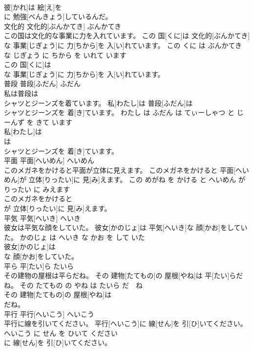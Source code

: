 \documentclass[8pt]{extreport}
\begin{document}
\begin{CJK}{UTF8}{min}
\\	彼[かれ]は 絵[え]を
\\	に 勉強[べんきょう]しているんだ。			
\\	文化的	文化的[ぶんかてき]	ぶんかてき	
\\	この国は文化的な事業に力を入れています。	この 国[くに]は 文化的[ぶんかてき]な 事業[じぎょう]に 力[ちから]を 入[い]れています。	この くに は ぶんかてき な じぎょう に ちから を いれて います	
\\	この 国[くに]は
\\	な 事業[じぎょう]に 力[ちから]を 入[い]れています。			
\\	普段	普段[ふだん]	ふだん	
\\	私は普段は
\\	シャツとジーンズを着ています。	私[わたし]は 普段[ふだん]は 
\\	[てぃー]シャツとジーンズを 着[き]ています。	わたし は ふだん は てぃーしゃつ と じーんず を きて います	
\\	私[わたし]は
\\	は 
\\	[てぃー]シャツとジーンズを 着[き]ています。			
\\	平面	平面[へいめん]	へいめん	
\\	このメガネをかけると平面が立体に見えます。	このメガネをかけると 平面[へいめん]が 立体[りったい]に 見[み]えます。	この めがね を かける と へいめん が りったい に みえます	
\\	このメガネをかけると
\\	が 立体[りったい]に 見[み]えます。			
\\	平気	平気[へいき]	へいき	
\\	彼女は平気な顔をしていた。	彼女[かのじょ]は 平気[へいき]な 顔[かお]をしていた。	かのじょ は へいき な かお を して いた	
\\	彼女[かのじょ]は
\\	な 顔[かお]をしていた。			
\\	平ら	平[たい]ら	たいら	
\\	その建物の屋根は平らだね。	その 建物[たてもの]の 屋根[やね]は 平[たい]らだね。	その たてもの の やね は たいら だ　ね	
\\	その 建物[たてもの]の 屋根[やね]は
\\	だね。			
\\	平行	平行[へいこう]	へいこう	
\\	平行に線を引いてください。	平行[へいこう]に 線[せん]を 引[ひ]いてください。	へいこう に せん を ひいて ください	
\\	に 線[せん]を 引[ひ]いてください。			

\end{CJK}
\end{document}
